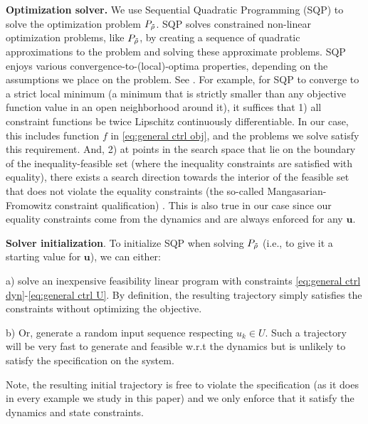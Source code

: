\textbf{Optimization solver.}
We use Sequential Quadratic Programming (SQP) to solve the optimization problem $P_{\tilde{\rho}}$.
SQP solves constrained non-linear optimization problems, like $P_{\tilde{\rho}}$, by creating a sequence of quadratic approximations to the problem and solving these approximate problems.
SQP enjoys various convergence-to-(local)-optima properties, depending on the assumptions we place on the problem. 
See \cite[Section 2.9]{Polak97_Optim}.
For example, for SQP to converge to a strict local minimum (a minimum that is strictly smaller than any objective function value in an open neighborhood around it), it suffices that 
1) all constraint functions be twice Lipschitz continuously differentiable. 
In our case, this includes function $f$ in \eqref{eq:general ctrl obj}, and the problems we solve satisfy this requirement.
And, 
2) at points in the search space that lie on the boundary of the inequality-feasible set (where the inequality constraints are satisfied with equality), there exists a search direction towards the interior of the feasible set that does not violate the equality constraints (the so-called Mangasarian-Fromowitz constraint qualification) \cite[Assumption 2.9.1]{Polak97_Optim}.
This is also true in our case since our equality constraints come from the dynamics and are always enforced for any $\mathbf{u}$.

\textbf{Solver initialization}.
To initialize SQP when solving $P_{\tilde{\rho}}$ (i.e., to give it a starting value for $\mathbf{u}$), we can either:

a) solve an inexpensive feasibility linear program with constraints \eqref{eq:general ctrl dyn}-\eqref{eq:general ctrl U}. By definition, the resulting trajectory simply satisfies the constraints without optimizing the objective.

b) Or, generate a random input sequence respecting $u_k \in U$. 
Such a trajectory will be very fast to generate and feasible w.r.t the dynamics but is unlikely to satisfy the specification on the system. 

Note, the resulting initial trajectory is free to violate the specification (as it does in every example we study in this paper) and we only enforce that it satisfy the dynamics and state constraints.



